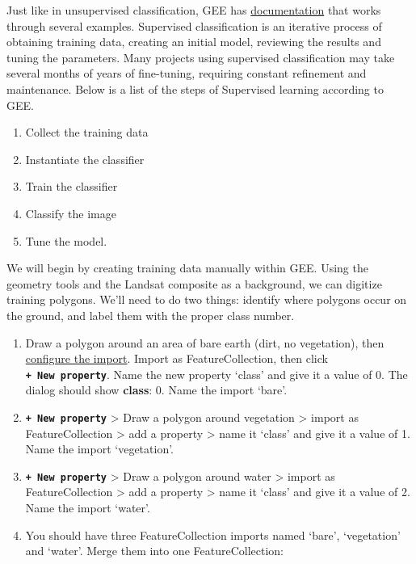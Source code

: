 \documentclass[
]{article}
\providecommand{\tightlist}{%
  \setlength{\itemsep}{0pt}\setlength{\parskip}{0pt}}
\begin{document}
Just like in unsupervised classification, GEE has \href{https://developers.google.com/earth-engine/classification}{documentation} that works through several examples. Supervised classification is an iterative process of obtaining training data, creating an initial model, reviewing the results and tuning the parameters. Many projects using supervised classification may take several months of years of fine-tuning, requiring constant refinement and maintenance. Below is a list of the steps of Supervised learning according to GEE.

\begin{enumerate}
\def\labelenumi{\arabic{enumi}.}
\tightlist
\item
  Collect the training data
\item
  Instantiate the classifier
\item
  Train the classifier
\item
  Classify the image
\item
  Tune the model.
\end{enumerate}

We will begin by creating training data manually within GEE. Using the geometry tools and the Landsat composite as a background, we can digitize training polygons. We'll need to do two things: identify where polygons occur on the ground, and label them with the proper class number.

\begin{enumerate}
\def\labelenumi{\arabic{enumi}.}
\tightlist
\item
  Draw a polygon around an area of bare earth (dirt, no vegetation), then \href{https://developers.google.com/earth-engine/playground\#geometry-tools}{configure the import}. Import as FeatureCollection, then click \textbf{\texttt{+\ New\ property}}. Name the new property `class' and give it a value of 0. The dialog should show \textbf{class}: 0. Name the import `bare'.
\item
  \textbf{\texttt{+\ New\ property}} \textgreater{} Draw a polygon around vegetation \textgreater{} import as FeatureCollection \textgreater{} add a property \textgreater{} name it `class' and give it a value of 1. Name the import `vegetation'.
\item
  \textbf{\texttt{+\ New\ property}} \textgreater{} Draw a polygon around water \textgreater{} import as FeatureCollection \textgreater{} add a property \textgreater{} name it `class' and give it a value of 2. Name the import `water'.
\item
  You should have three FeatureCollection imports named `bare', `vegetation' and `water'. Merge them into one FeatureCollection:
\end{enumerate}
\end{document}
